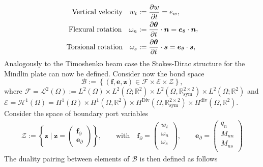 \documentclass[preprint,12pt]{elsarticle}
\begin{document}
{\begin{equation}
\label{eq:wtwnws}
\begin{aligned}
\text{Vertical velocity}  \quad w_t &:= \diffp{w}{t} = e_w, \\
\text{Flexural rotation} \quad 
\omega_{n} &:= \diffp{\bm{\theta}}{t} \cdot \bm{n} = \bm{e}_\theta \cdot \bm{n} \\
\text{Torsional rotation} \quad 
\omega_{s} &:= \diffp{\bm{\theta}}{t} \cdot \bm{s} = \bm{e}_\theta \cdot \bm{s},	
\end{aligned},
\end{equation}
Analogously to the Timoshenko beam case the Stokes-Dirac structure for the Mindlin plate can now be defined. Consider now the bond space
\begin{equation}
\label{eq:bondMin}
\mathcal{B} := \left\{(\bm{f}, \bm{e}, \bm{z}) \in \mathcal{F} \times \mathcal{E} \times \mathcal{Z} \right\},
\end{equation}
where $\mathcal{F}=  \mathscr{L}^2(\Omega) := 
L^2(\Omega) \times L^2(\Omega; \mathbb{R}^2) \times L^2(\Omega, \mathbb{R}^{2 \times 2}_{\text{sym}}) \times L^2(\Omega; \mathbb{R}^2)$ and $ \mathcal{E} =  \mathscr{H}^1(\Omega) = H^{1}(\Omega) \times H^{1}(\Omega, \mathbb{R}^2) \times H^{\text{Div}}(\Omega, \mathbb{R}^{2 \times 2}_{\text{sym}}) \times H^{\text{div}}(\Omega, \mathbb{R}^2)$. Consider the space of boundary port variables
\begin{equation}
\begin{gathered}
\mathcal{Z} := \left\{ \bm{z} \; \vert \; \bm{z} = \begin{pmatrix} \bm{f}_{\partial} \\ \bm{e}_{\partial} \end{pmatrix} \right\}, \qquad \text{with} \quad
\bm{f}_\partial = 
\begin{pmatrix}
w_t \\ \omega_{n} \\ \omega_{s} \\
\end{pmatrix}, \qquad
\bm{e}_\partial = 
\begin{pmatrix}
q_n \\ M_{nn} \\ M_{ns} \\
\end{pmatrix}
\end{gathered}
\end{equation}
The duality pairing between elements of $\mathcal{B}$ is then defined as follows
\begin{equation}

\end{equation}}
\end{document}
